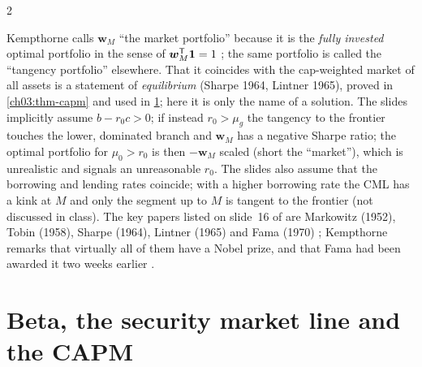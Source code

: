 \begin{paracol}{2}
\begin{coursenote}
Kempthorne calls $\bm w_M$ ``the market portfolio'' because it is the \emph{fully invested} optimal
portfolio in the sense of $\bm w_M^{\mathsf T}\bm 1=1$ ; the same portfolio is called the ``tangency portfolio''
elsewhere. That it coincides with the cap-weighted market of all assets is a statement of \emph{equilibrium}
(Sharpe 1964, Lintner 1965), proved in \cref{ch03:thm-capm} and used in \cref{ch10:sec-capm}; here it is only the
name of a solution. The slides implicitly assume $b-r_0c>0$; if instead $r_0>\mu_g$ the tangency to the frontier
touches the lower, dominated branch and $\bm w_M$ has a negative Sharpe ratio; the optimal portfolio for $\mu_0>r_0$
is then $-\bm w_M$ scaled (short the ``market''), which is unrealistic and signals an unreasonable $r_0$. The
slides also assume that the borrowing and lending rates coincide; with a higher borrowing rate the CML has a
kink at $M$ and only the segment up to $M$ is tangent to the frontier (not discussed in class).
The key papers listed on slide~16 of  are Markowitz (1952), Tobin (1958), Sharpe (1964),
Lintner (1965) and Fama (1970) ; Kempthorne remarks that virtually all of them have a Nobel prize,
and that Fama had been awarded it two weeks earlier .
\end{coursenote}

\section{Beta, the security market line and the CAPM}\label{ch10:sec-capm}


\end{paracol}

